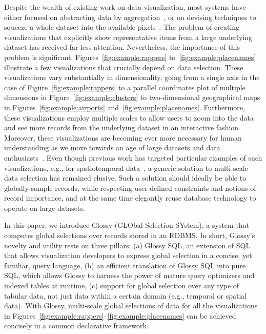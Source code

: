 \documentclass[11pt, oneside]{report}
\begin{document}
Despite the wealth of existing work on data visualization, most systems have either focused on abstracting data by aggregation~\cite{blais:generating,LinsKS13:Nanocubes,StolteTH:2003:Multiscale,vartak:seedb}, or on devising techniques to squeeze a whole dataset into the available pixels~\cite{KeimK95:VisDB,KruskalW78:MDS}. The problem of creating visualizations that explicitly show representative items from a large underlying dataset has received far less attention. Nevertheless, the importance of this problem is significant. Figures~\ref{fig:example:rappers} to~\ref{fig:example:placenames} illustrate a few visualizations that crucially depend on data selection. These visualizations vary substantially in dimensionality, going from a single axis in the case of Figure~\ref{fig:example:rappers} to a parallel coordinates plot of multiple dimensions in Figure~\ref{fig:example:clusters} to two-dimensional geographical maps in Figures~\ref{fig:example:airports} and~\ref{fig:example:placenames}. Furthermore, these visualizations employ multiple scales to allow users to zoom into the data and see more records from the underlying dataset in an interactive fashion. Moreover, these visualizations are becoming ever more necessary for human understanding as we move towards an age of large datasets and data enthusiasts~\cite{hanrahan:enthusiast,markl:breaking}. Even though previous work has targeted particular examples of such visualizations, e.g., for spatiotemporal data~\cite{jugel:m4,KefaloukosSZ14:CVL,DasSarmaLGMH12:FusionTables}, a generic solution to multi-scale data selection has remained elusive. Such a solution should ideally be able to globally sample records, while respecting user-defined constraints and notions of record importance, and at the same time elegantly reuse database technology to operate on large datasets.   


In this paper, we introduce Glossy (GLObal Selection SYstem), a system that computes global selections over records stored in an RDBMS. In short, Glossy's novelty and utility rests on three pillars: (a) Glossy SQL, an extension of SQL that allows visualization developers to express global selection in a concise, yet familiar, query language, (b) an efficient translation of Glossy SQL into pure SQL, which allows Glossy to harness the power of mature query optimizers and indexed tables at runtime, (c) support for global selection over any type of tabular data, not just data within a certain domain (e.g., temporal or spatial data). With Glossy, multi-scale global selections of data for all the visualizations in Figures~\ref{fig:example:rappers}--\ref{fig:example:placenames} can be achieved concisely in a common declarative framework.  
\end{document}
